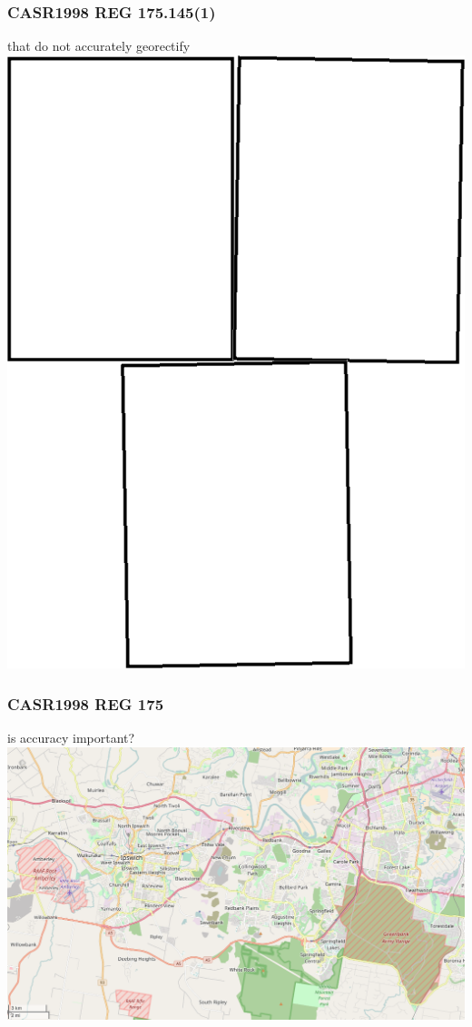\begin{frame}
\frametitle{CASR1998 REG 175.145(1)}
\begin{block}{that do not accurately georectify}
\includegraphics[height=0.5\textheight]{image/georectification.png}
\end{block}
\end{frame}

\begin{frame}
\frametitle{CASR1998 REG 175}
\begin{block}{is accuracy important?}
\includegraphics[height=0.5\textheight]{image/map-amberley-greenbank.png}
\end{block}
\end{frame}

